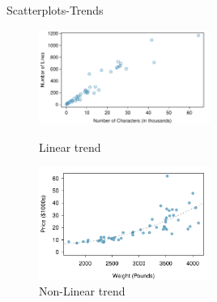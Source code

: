 \documentclass[12pt,a4paper]{beamer}
\begin{document}
\begin{frame}{Scatterplots-Trends}
\begin{figure}
	\centering
		
	   \includegraphics[width=0.5\textwidth]{email50LinesCharacters}
\caption{Linear trend}
	\includegraphics[width=0.5\textwidth]{figures/carsPriceVsWeight/carsPriceVsWeight}
\caption{Non-Linear trend}
	\end{figure}	
\end{frame}
\end{document}
